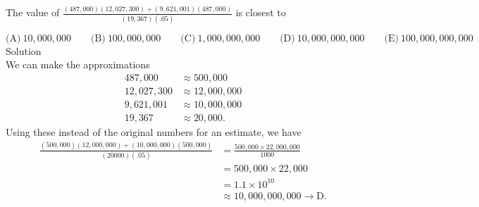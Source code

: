 

The value of $\frac{(487,000)(12,027,300)+(9,621,001)(487,000)}{(19,367)(.05)}$ is closest to

$\text{(A)}\ 10,000,000 \qquad \text{(B)}\ 100,000,000 \qquad \text{(C)}\ 1,000,000,000 \qquad \text{(D)}\ 10,000,000,000 \qquad \text{(E)}\ 100,000,000,000$
\\
Solution
\\
We can make the approximations \begin{align*} 487,000 &\approx 500,000 \\  12,027,300 &\approx 12,000,000 \\ 9,621,001 &\approx 10,000,000 \\ 19,367 &\approx 20,000. \end{align*}
Using these instead of the original numbers for an estimate, we have \begin{align*} \frac{(500,000)(12,000,000)+(10,000,000)(500,000)}{(20000)(.05)} &= \frac{500,000\times 22,000,000}{1000} \\ &= 500,000 \times 22,000 \\ &= 1.1\times 10^{10} \\ &\approx 10,000,000,000 \rightarrow \boxed{\text{D}}. \end{align*}
